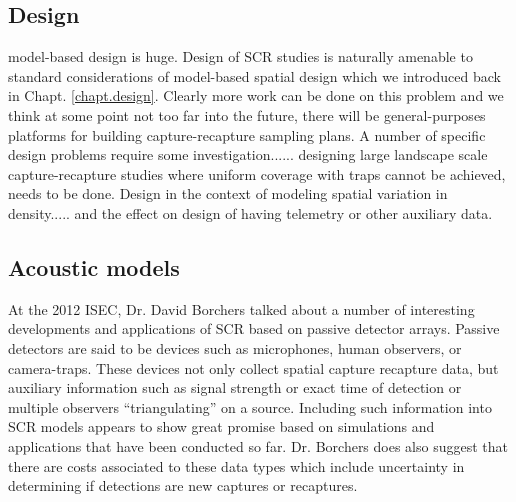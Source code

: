 \subsection{Design}

model-based design is huge. Design of SCR studies is naturally
amenable to standard considerations of model-based spatial design
\citep{muller:2007} which we introduced back in
Chapt. \ref{chapt.design}. Clearly more work can be done on this
problem and we think at some point not too far into the future, there
will be general-purposes platforms for building capture-recapture
sampling plans.
A number of specific design problems require some
investigation...... designing large landscape scale capture-recapture
studies where uniform coverage with traps cannot be achieved, needs
to be done.
Design in the context of modeling spatial variation in
density..... and the effect on design of having telemetry or other
auxiliary data.


\subsection{Acoustic models}
At the 2012 ISEC, Dr. David Borchers talked about a number of interesting 
developments and applications of SCR based on passive detector 
arrays. Passive detectors are said to be devices such as microphones,
human observers, or camera-traps.  These devices not only collect spatial
capture recapture data, but auxiliary information such as signal strength or 
exact time of detection or multiple observers ``triangulating'' on a source. 
 Including such information into SCR models appears to 
show great promise based on simulations and applications that have been conducted 
so far.  Dr. Borchers does also suggest that there are costs associated to these
data types which include uncertainty in determining if detections are new captures
or recaptures.  


